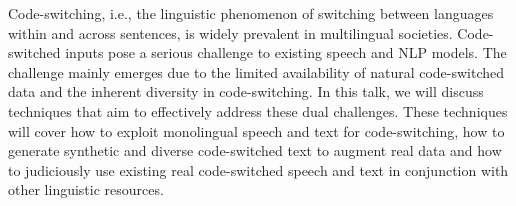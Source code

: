 Code-switching, i.e., the linguistic phenomenon of switching between languages within and across sentences, is widely prevalent in multilingual societies. Code-switched inputs pose a serious challenge to existing speech and NLP models. The challenge mainly emerges due to the limited availability of natural code-switched data and the inherent diversity in code-switching. In this talk, we will discuss techniques that aim to effectively address these dual challenges. These techniques will cover how to exploit monolingual speech and text for code-switching, how to generate synthetic and diverse code-switched text to augment real data and how to judiciously use existing real code-switched speech and text in conjunction with other linguistic resources.